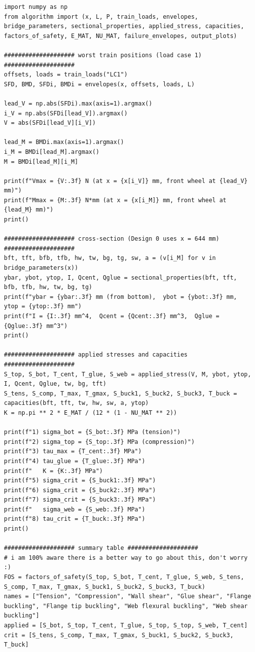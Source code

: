 \begin{verbatim}
import numpy as np
from algorithm import (x, L, P, train_loads, envelopes, bridge_parameters, sectional_properties, applied_stress, capacities, factors_of_safety, E_MAT, NU_MAT, failure_envelopes, output_plots)

#################### worst train positions (load case 1) ####################
offsets, loads = train_loads("LC1")
SFD, BMD, SFDi, BMDi = envelopes(x, offsets, loads, L)

lead_V = np.abs(SFDi).max(axis=1).argmax()
i_V = np.abs(SFDi[lead_V]).argmax()
V = abs(SFDi[lead_V][i_V])

lead_M = BMDi.max(axis=1).argmax()
i_M = BMDi[lead_M].argmax()
M = BMDi[lead_M][i_M]

print(f"Vmax = {V:.3f} N (at x = {x[i_V]} mm, front wheel at {lead_V} mm)")
print(f"Mmax = {M:.3f} N*mm (at x = {x[i_M]} mm, front wheel at {lead_M} mm)")
print()

#################### cross-section (Design 0 uses x = 644 mm) ####################
bft, tft, bfb, tfb, hw, tw, bg, tg, sw, a = (v[i_M] for v in bridge_parameters(x))
ybar, ybot, ytop, I, Qcent, Qglue = sectional_properties(bft, tft, bfb, tfb, hw, tw, bg, tg)
print(f"ybar = {ybar:.3f} mm (from bottom),  ybot = {ybot:.3f} mm,  ytop = {ytop:.3f} mm")
print(f"I = {I:.3f} mm^4,  Qcent = {Qcent:.3f} mm^3,  Qglue = {Qglue:.3f} mm^3")
print()

#################### applied stresses and capacities ####################
S_top, S_bot, T_cent, T_glue, S_web = applied_stress(V, M, ybot, ytop, I, Qcent, Qglue, tw, bg, tft)
S_tens, S_comp, T_max, T_gmax, S_buck1, S_buck2, S_buck3, T_buck = capacities(bft, tft, tw, hw, sw, a, ytop)
K = np.pi ** 2 * E_MAT / (12 * (1 - NU_MAT ** 2))

print(f"1) sigma_bot = {S_bot:.3f} MPa (tension)")
print(f"2) sigma_top = {S_top:.3f} MPa (compression)")
print(f"3) tau_max = {T_cent:.3f} MPa")
print(f"4) tau_glue = {T_glue:.3f} MPa")
print(f"   K = {K:.3f} MPa")
print(f"5) sigma_crit = {S_buck1:.3f} MPa")
print(f"6) sigma_crit = {S_buck2:.3f} MPa")
print(f"7) sigma_crit = {S_buck3:.3f} MPa")
print(f"   sigma_web = {S_web:.3f} MPa")
print(f"8) tau_crit = {T_buck:.3f} MPa")
print()

#################### summary table ####################
# i am 100% aware there is a better way to go about this, don't worry :)
FOS = factors_of_safety(S_top, S_bot, T_cent, T_glue, S_web, S_tens, S_comp, T_max, T_gmax, S_buck1, S_buck2, S_buck3, T_buck)
names = ["Tension", "Compression", "Wall shear", "Glue shear", "Flange buckling", "Flange tip buckling", "Web flexural buckling", "Web shear buckling"]
applied = [S_bot, S_top, T_cent, T_glue, S_top, S_top, S_web, T_cent]
crit = [S_tens, S_comp, T_max, T_gmax, S_buck1, S_buck2, S_buck3, T_buck]


\end{verbatim}
